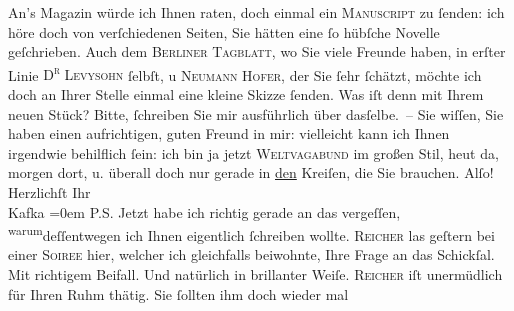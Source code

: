 \begin{ledgroupsized}[t]{13cm}
           \pstart
           An’s Magazin würde ich Ihnen raten, doch einmal
               ein \textsc{Manuscript} zu ſenden: ich höre doch von verſchiedenen
               Seiten, Sie hätten eine ſo hübſche Novelle geſchrieben. Auch dem {\pb}\textsc{Berliner Tagblatt}, wo Sie viele Freunde haben, in erſter Linie \textsc{D\textsuperscript{r}{ }Levysohn}{ }ſelbſt, u \textsc{Neumann Hofer}, der Sie ſehr ſchätzt, möchte ich doch an Ihrer Stelle einmal eine kleine
               Skizze ſenden.\pend
           \pstart
           Was iſt denn mit Ihrem neuen Stück? Bitte, ſchreiben Sie mir ausführlich über
               dasſelbe. – Sie wiſſen, Sie haben einen aufrichtigen, guten Freund in mir: vielleicht
               kann ich Ihnen irgendwie behilflich ſein: ich bin ja jetzt \textsc{Weltvagabund} im großen Stil, heut da, morgen dort, u. überall doch nur
               gerade in \uline{den} Kreiſen, die Sie brauchen. Alſo!\pend
           \pstart
           Herzlichſt Ihr{\\[\baselineskip]}\spacefill\mbox{Kafka}\pend
           \leftskip=0em{}\pstart
           \noindent{}{\pb}\textsc{P.S.}\pend
           \pstart
           Jetzt habe ich richtig gerade an das vergeſſen, \substVorne{}\textsuperscript{warum}\substDazwischen{}deſſentwegen\substHinten{} ich Ihnen eigentlich ſchreiben wollte.\pend
           \pstart
           \textsc{Reicher} las geſtern bei einer \textsc{Soiree} hier, welcher ich
                  gleichfalls beiwohnte, Ihre Frage an das
                     Schickſal. Mit richtigem Beifall. Und natürlich in brillanter Weiſe. \textsc{Reicher} iſt unermüdlich für Ihren Ruhm thätig. Sie ſollten ihm doch wieder mal

\end{ledgroupsized}

